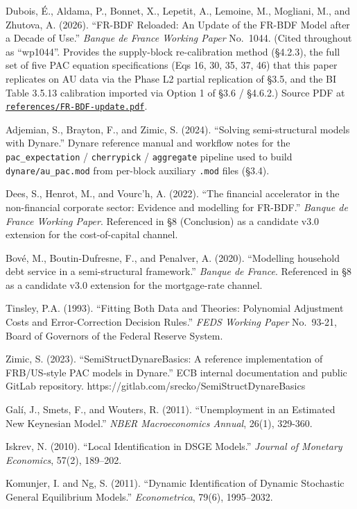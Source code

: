 \documentclass[
]{article}
\begin{document}
Dubois, É., Aldama, P., Bonnet, X., Lepetit, A., Lemoine, M., Mogliani,
M., and Zhutova, A. (2026). ``FR-BDF Reloaded: An Update of the FR-BDF
Model after a Decade of Use.'' \emph{Banque de France Working Paper}
No.~1044. (Cited throughout as ``wp1044''. Provides the supply-block
re-calibration method (§4.2.3), the full set of five PAC equation
specifications (Eqs 16, 30, 35, 37, 46) that this paper replicates on AU
data via the Phase L2 partial replication of §3.5, and the BI Table
3.5.13 calibration imported via Option 1 of §3.6 / §4.6.2.) Source PDF
at
\href{../references/FR-BDF-update.pdf}{\texttt{references/FR-BDF-update.pdf}}.

Adjemian, S., Brayton, F., and Zimic, S. (2024). ``Solving
semi-structural models with Dynare.'' Dynare reference manual and
workflow notes for the \texttt{pac\_expectation} / \texttt{cherrypick} /
\texttt{aggregate} pipeline used to build \texttt{dynare/au\_pac.mod}
from per-block auxiliary \texttt{.mod} files (§3.4).

Dees, S., Henrot, M., and Vourc'h, A. (2022). ``The financial
accelerator in the non-financial corporate sector: Evidence and
modelling for FR-BDF.'' \emph{Banque de France Working Paper}.
Referenced in §8 (Conclusion) as a candidate v3.0 extension for the
cost-of-capital channel.

Bové, M., Boutin-Dufresne, F., and Penalver, A. (2020). ``Modelling
household debt service in a semi-structural framework.'' \emph{Banque de
France}. Referenced in §8 as a candidate v3.0 extension for the
mortgage-rate channel.

Tinsley, P.A. (1993). ``Fitting Both Data and Theories: Polynomial
Adjustment Costs and Error-Correction Decision Rules.'' \emph{FEDS
Working Paper} No.~93-21, Board of Governors of the Federal Reserve
System.

Zimic, S. (2023). ``SemiStructDynareBasics: A reference implementation
of FRB/US-style PAC models in Dynare.'' ECB internal documentation and
public GitLab repository.
https://gitlab.com/srecko/SemiStructDynareBasics

Galí, J., Smets, F., and Wouters, R. (2011). ``Unemployment in an
Estimated New Keynesian Model.'' \emph{NBER Macroeconomics Annual},
26(1), 329-360.

Iskrev, N. (2010). ``Local Identification in DSGE Models.''
\emph{Journal of Monetary Economics}, 57(2), 189--202.

Komunjer, I. and Ng, S. (2011). ``Dynamic Identification of Dynamic
Stochastic General Equilibrium Models.'' \emph{Econometrica}, 79(6),
1995--2032.
\end{document}
